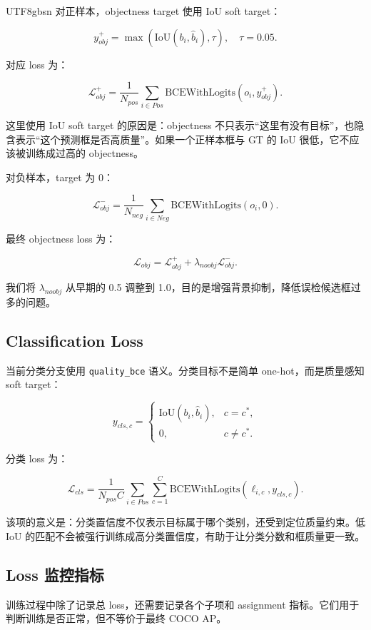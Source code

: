 \documentclass[11pt,a4paper]{article}
\newcommand{\code}[1]{\texttt{#1}}
\begin{document}
\begin{CJK*}{UTF8}{gbsn}
对正样本，objectness target 使用 IoU soft target：

\[
  y_{obj}^{+}
  =
  \max(\mathrm{IoU}(b_i,\hat{b}_i),\tau),
  \quad \tau=0.05.
\]

对应 loss 为：

\[
  \mathcal{L}_{obj}^{+}
  =
  \frac{1}{N_{pos}}
  \sum_{i\in Pos}
  \mathrm{BCEWithLogits}(o_i,y_{obj}^{+}).
\]

这里使用 IoU soft target 的原因是：objectness 不只表示“这里有没有目标”，也隐含表示“这个预测框是否高质量”。如果一个正样本框与 GT 的 IoU 很低，它不应该被训练成过高的 objectness。

对负样本，target 为 0：

\[
  \mathcal{L}_{obj}^{-}
  =
  \frac{1}{N_{neg}}
  \sum_{i\in Neg}
  \mathrm{BCEWithLogits}(o_i,0).
\]

最终 objectness loss 为：

\[
  \mathcal{L}_{obj}
  =
  \mathcal{L}_{obj}^{+}
  +
  \lambda_{noobj}\mathcal{L}_{obj}^{-}.
\]

我们将 $\lambda_{noobj}$ 从早期的 0.5 调整到 1.0，目的是增强背景抑制，降低误检候选框过多的问题。

\subsection{Classification Loss}

当前分类分支使用 \code{quality\_bce} 语义。分类目标不是简单 one-hot，而是质量感知 soft target：

\[
  y_{cls,c}
  =
  \begin{cases}
    \mathrm{IoU}(b_i,\hat{b}_i), & c=c^*,\\
    0, & c\neq c^*.
  \end{cases}
\]

分类 loss 为：

\[
  \mathcal{L}_{cls}
  =
  \frac{1}{N_{pos}C}
  \sum_{i\in Pos}\sum_{c=1}^{C}
  \mathrm{BCEWithLogits}(\ell_{i,c},y_{cls,c}).
\]

该项的意义是：分类置信度不仅表示目标属于哪个类别，还受到定位质量约束。低 IoU 的匹配不会被强行训练成高分类置信度，有助于让分类分数和框质量更一致。

\subsection{Loss 监控指标}

训练过程中除了记录总 loss，还需要记录各个子项和 assignment 指标。它们用于判断训练是否正常，但不等价于最终 COCO AP。


\end{CJK*}
\end{document}
